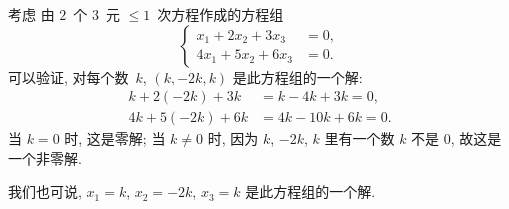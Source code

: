\documentclass[../libro.tex]{subfiles}
\begin{document}
\begin{example}
    考虑%
    由 \(2\)~个 \(3\)~元 \({\leq} 1\)~次方程作成的方程组
    \begin{equation*}
        \left\{ %
        \begin{aligned}
            x_1 + 2x_2 + 3x_3  & = 0, \\
            4x_1 + 5x_2 + 6x_3 & = 0.
        \end{aligned}
        \right. %
    \end{equation*}
    可以验证, 对每个数~\(k\),
    \((k, -2k, k)\) 是此方程组的一个解:
    \begin{align*}
        k + 2(-2k) + 3k  & = k - 4k + 3k = 0,   \\
        4k + 5(-2k) + 6k & = 4k - 10k + 6k = 0.
    \end{align*}
    当 \(k = 0\) 时, 这是零解;
    当 \(k \neq 0\) 时, 因为
    \(k\), \(-2k\), \(k\) 里有一个数 \(k\) 不是 \(0\),
    故这是一个非零解.

    我们也可说,
    \(x_1 = k\),
    \(x_2 = -2k\),
    \(x_3 = k\)
    是此方程组的一个解.
\end{example}
\end{document}
